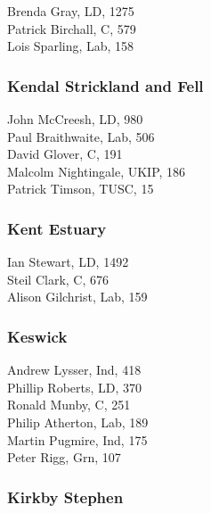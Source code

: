 \documentclass[a4paper,openany,10pt]{book}
\begin{document}


Brenda Gray, LD, 1275\\
Patrick Birchall, C, 579\\
Lois Sparling, Lab, 158\\


\subsubsection*{Kendal Strickland and Fell}



John McCreesh, LD, 980\\
Paul Braithwaite, Lab, 506\\
David Glover, C, 191\\
Malcolm Nightingale, UKIP, 186\\
Patrick Timson, TUSC, 15\\


\subsubsection*{Kent Estuary}



Ian Stewart, LD, 1492\\
Steil Clark, C, 676\\
Alison Gilchrist, Lab, 159\\


\subsubsection*{Keswick}



Andrew Lysser, Ind, 418\\
Phillip Roberts, LD, 370\\
Ronald Munby, C, 251\\
Philip Atherton, Lab, 189\\
Martin Pugmire, Ind, 175\\
Peter Rigg, Grn, 107\\


\subsubsection*{Kirkby Stephen}
\end{document}
